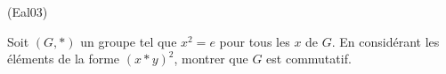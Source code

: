 \begin{tiny}(Eal03)\end{tiny} Soit $(G,*)$ un groupe tel que $x^{2} = e$ pour tous les $x$ de $G$. En considérant les éléments de la forme $(x*y)^{2}$, montrer que $G$ est commutatif.